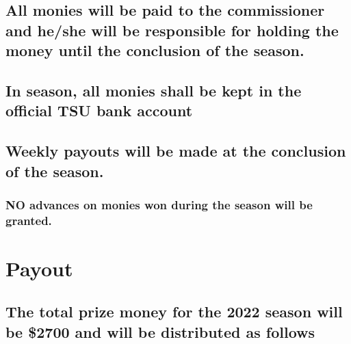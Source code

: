 \documentclass[
]{book}
\begin{document}
\hypertarget{all-monies-will-be-paid-to-the-commissioner-and-heshe-will-be-responsible-for-holding-the-money-until-the-conclusion-of-the-season.}{%
\subsection{All monies will be paid to the commissioner and he/she will be responsible for holding the money until the conclusion of the season.}\label{all-monies-will-be-paid-to-the-commissioner-and-heshe-will-be-responsible-for-holding-the-money-until-the-conclusion-of-the-season.}}

\hypertarget{in-season-all-monies-shall-be-kept-in-the-official-tsu-bank-account}{%
\subsection{In season, all monies shall be kept in the official TSU bank account}\label{in-season-all-monies-shall-be-kept-in-the-official-tsu-bank-account}}

\hypertarget{weekly-payouts-will-be-made-at-the-conclusion-of-the-season.}{%
\subsection{Weekly payouts will be made at the conclusion of the season.}\label{weekly-payouts-will-be-made-at-the-conclusion-of-the-season.}}

\hypertarget{no-advances-on-monies-won-during-the-season-will-be-granted.}{%
\subsubsection{NO advances on monies won during the season will be granted.}\label{no-advances-on-monies-won-during-the-season-will-be-granted.}}

\hypertarget{payout}{%
\section{Payout}\label{payout}}

\hypertarget{the-total-prize-money-for-the-2022-season-will-be-2700-and-will-be-distributed-as-follows}{%
\subsection{The total prize money for the 2022 season will be \$2700 and will be distributed as follows}\label{the-total-prize-money-for-the-2022-season-will-be-2700-and-will-be-distributed-as-follows}}
\end{document}
